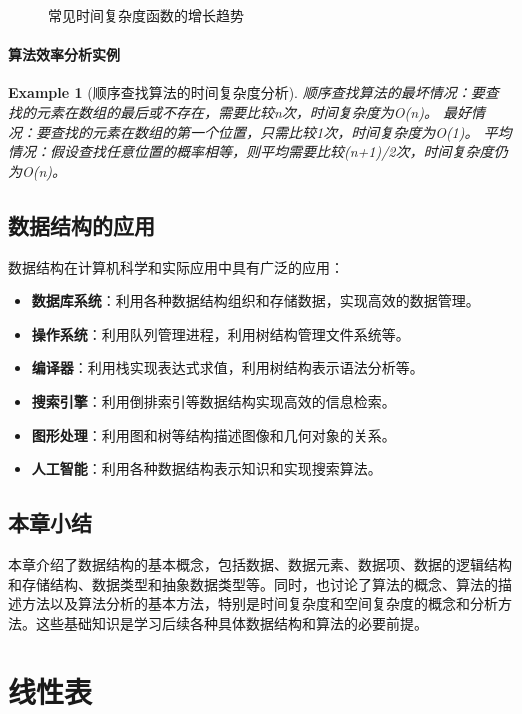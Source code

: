 \documentclass{../../note}
\newtheorem{example}{Example}
\begin{document}
\begin{figure}[h]
  \centering
  \caption{常见时间复杂度函数的增长趋势}
\end{figure}

\paragraph{算法效率分析实例}
\begin{example}[顺序查找算法的时间复杂度分析]
  顺序查找算法的最坏情况：要查找的元素在数组的最后或不存在，需要比较n次，时间复杂度为O(n)。
  最好情况：要查找的元素在数组的第一个位置，只需比较1次，时间复杂度为O(1)。
  平均情况：假设查找任意位置的概率相等，则平均需要比较(n+1)/2次，时间复杂度仍为O(n)。
\end{example}

\subsection{数据结构的应用}

数据结构在计算机科学和实际应用中具有广泛的应用：

\begin{itemize}
  \item \textbf{数据库系统}：利用各种数据结构组织和存储数据，实现高效的数据管理。
  \item \textbf{操作系统}：利用队列管理进程，利用树结构管理文件系统等。
  \item \textbf{编译器}：利用栈实现表达式求值，利用树结构表示语法分析等。
  \item \textbf{搜索引擎}：利用倒排索引等数据结构实现高效的信息检索。
  \item \textbf{图形处理}：利用图和树等结构描述图像和几何对象的关系。
  \item \textbf{人工智能}：利用各种数据结构表示知识和实现搜索算法。
\end{itemize}

\subsection{本章小结}
本章介绍了数据结构的基本概念，包括数据、数据元素、数据项、数据的逻辑结构和存储结构、数据类型和抽象数据类型等。同时，也讨论了算法的概念、算法的描述方法以及算法分析的基本方法，特别是时间复杂度和空间复杂度的概念和分析方法。这些基础知识是学习后续各种具体数据结构和算法的必要前提。

\section{线性表}
\end{document}
